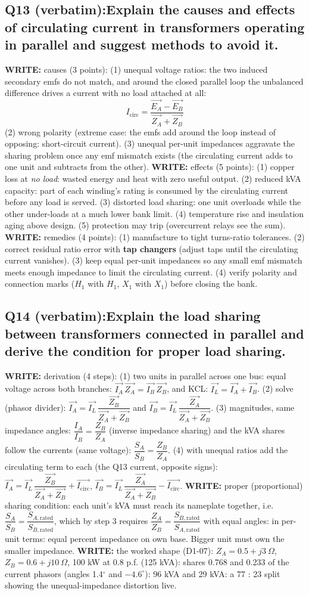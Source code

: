 \documentclass[11pt]{article}
\newcommand{\q}[2]{\subsection*{\color{copper}#1\quad\color{iron}#2}}
\newcommand{\w}[1]{\textbf{\color{copper}WRITE:} #1}
\begin{document}
\q{Q13 (verbatim):}{Explain the causes and effects of circulating current in transformers operating in parallel and suggest methods to avoid it.}
\w{causes (3 points):} (1) unequal voltage ratios: the two induced secondary emfs do not match, and around the closed parallel loop the unbalanced difference drives a current with no load attached at all:
\[
I_{\text{circ}} = \dfrac{\vec{E_A} - \vec{E_B}}{\vec{Z_A} + \vec{Z_B}}
\]
(2) wrong polarity (extreme case: the emfs add around the loop instead of opposing: short-circuit current). (3) unequal per-unit impedances aggravate the sharing problem once any emf mismatch exists (the circulating current adds to one unit and subtracts from the other).
\w{effects (5 points):} (1) copper loss at \emph{no load}: wasted energy and heat with zero useful output. (2) reduced kVA capacity: part of each winding's rating is consumed by the circulating current before any load is served. (3) distorted load sharing: one unit overloads while the other under-loads at a much lower bank limit. (4) temperature rise and insulation aging above design. (5) protection may trip (overcurrent relays see the sum).
\w{remedies (4 points):} (1) manufacture to tight turns-ratio tolerances. (2) correct residual ratio error with \textbf{tap changers} (adjust taps until the circulating current vanishes). (3) keep equal per-unit impedances so any small emf mismatch meets enough impedance to limit the circulating current. (4) verify polarity and connection marks ($H_1$ with $H_1$, $X_1$ with $X_1$) before closing the bank.

\q{Q14 (verbatim):}{Explain the load sharing between transformers connected in parallel and derive the condition for proper load sharing.}
\w{derivation (4 steps):} (1) two units in parallel across one bus: equal voltage across both branches: $\vec{I_A}\, \vec{Z_A} = \vec{I_B}\, \vec{Z_B}$, and KCL: $\vec{I_L} = \vec{I_A} + \vec{I_B}$. (2) solve (phasor divider): $\vec{I_A} = \vec{I_L}\, \dfrac{\vec{Z_B}}{\vec{Z_A} + \vec{Z_B}}$ and $\vec{I_B} = \vec{I_L}\, \dfrac{\vec{Z_A}}{\vec{Z_A} + \vec{Z_B}}$. (3) magnitudes, same impedance angles: $\dfrac{I_A}{I_B} = \dfrac{Z_B}{Z_A}$ (inverse impedance sharing) and the kVA shares follow the currents (same voltage): $\dfrac{S_A}{S_B} = \dfrac{Z_B}{Z_A}$. (4) with unequal ratios add the circulating term to each (the Q13 current, opposite signs): $\vec{I_A} = \vec{I_L}\,\dfrac{\vec{Z_B}}{\vec{Z_A} + \vec{Z_B}} + \vec{I_{\text{circ}}}$, $\vec{I_B} = \vec{I_L}\,\dfrac{\vec{Z_A}}{\vec{Z_A} + \vec{Z_B}} - \vec{I_{\text{circ}}}$.
\w{proper (proportional) sharing condition:} each unit's kVA must reach its nameplate together, i.e. $\dfrac{S_A}{S_B} = \dfrac{S_{A,\text{rated}}}{S_{B,\text{rated}}}$, which by step 3 requires $\boxed{\dfrac{Z_A}{Z_B} = \dfrac{S_{B,\text{rated}}}{S_{A,\text{rated}}}}$ with equal angles: in per-unit terms: equal percent impedance on own base. Bigger unit must own the smaller impedance.
\w{the worked shape (D1-07):} $Z_A = 0.5 + j3\ \Omega$, $Z_B = 0.6 + j10\ \Omega$, 100 kW at 0.8 p.f. (125 kVA): shares 0.768 and 0.233 of the current phasors (angles 1.4$^\circ$ and $-4.6^{\circ}$): 96 kVA and 29 kVA: a 77 : 23 split showing the unequal-impedance distortion live.
\end{document}
